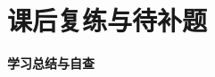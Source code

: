 \documentclass[11pt,a4paper]{ctexart}
\begin{document}

\newpage

\section{课后复练与待补题}

\automcfigurequestion{\qTJWPyramidSkewAngleTwoStem}{\qTJWPyramidSkewAngleTwoOptions}{\qTJWPyramidSkewAngleTwoFigure[0.9]}
\choiceworkarea[3.2cm]

\autoquestion{\qTJWTriangleIdentitiesTwoStem}
\qTJWTriangleIdentitiesTwoOptions
\choiceworkarea[3.2cm]

\autoquestion{\qTJWTriangleIdentitiesThreeStem}
\qTJWTriangleIdentitiesThreeOptions
\vspace*{\fill}

\newpage

\automcfigurequestion{\qTJWCubeDynamicAngleStem}{\qTJWCubeDynamicAngleOptions}{\qTJWCubeDynamicAngleFigure}
\choiceworkarea[4.0cm]

\automcfigurequestion{\qTJWPrismPropertiesStem}{\qTJWPrismPropertiesOptions}{\qTJWPrismPropertiesFigure[0.85]}
\choiceworkarea[4.0cm]

\freequestionheader
{\small \qTJWZeroSixFifteenStem}

\newpage

\freequestionheader
\begin{minipage}[t]{0.65\textwidth}
  \vspace{0pt}
  {\small \qTJWZeroSixSeventeenStem}
\end{minipage}
\begin{minipage}[t]{0.32\textwidth}
  \vspace{0pt}
  \hfill
  \qTJWZeroSixSeventeenFigure[1.1]
\end{minipage}


\newpage

\begin{center}
  {\Large\bfseries 学习总结与自查}
\end{center}
\end{document}
